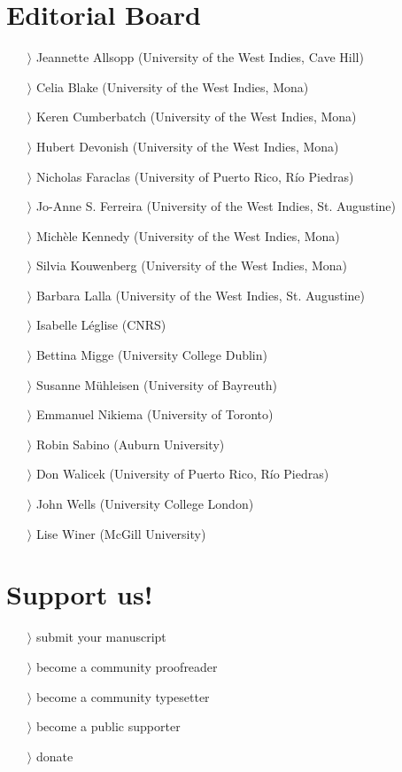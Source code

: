 \documentclass[
notumble,
nofoldmark,
]{leaflet}
\begin{document}
{{    \section{\color{LIGHTGRAY} \sffamily \Large Editorial Board }   
    \begin{itemize}
    \item[$\rangle$] Jeannette Allsopp (University of the West Indies, Cave Hill)
    \item[$\rangle$] Celia Blake (University of the West Indies, Mona)
    \item[$\rangle$] Keren Cumberbatch (University of the West Indies, Mona)
    \item[$\rangle$] Hubert Devonish (University of the West Indies, Mona)
    \item[$\rangle$] Nicholas Faraclas (University of Puerto Rico, R\'io Piedras)
    \item[$\rangle$] Jo-Anne S. Ferreira (University of the West Indies, St. Augustine)
    \item[$\rangle$] Mich\`ele Kennedy (University of the West Indies, Mona)
    \item[$\rangle$] Silvia Kouwenberg (University of the West Indies, Mona)
    \item[$\rangle$] Barbara Lalla (University of the West Indies, St. Augustine)
    \item[$\rangle$] Isabelle L\'eglise (CNRS)
    \item[$\rangle$] Bettina Migge (University College Dublin)
    \item[$\rangle$] Susanne M\"uhleisen (University of Bayreuth)
    \item[$\rangle$] Emmanuel Nikiema (University of Toronto)
    \item[$\rangle$] Robin Sabino (Auburn University)
    \item[$\rangle$] Don Walicek (University of Puerto Rico, Río Piedras)
    \item[$\rangle$] John Wells (University College London)
    \item[$\rangle$] Lise Winer (McGill University)
    \end{itemize}
    
    \section{\color{LIGHTGRAY} \sffamily \Large Support us!}
	\begin{itemize}
	  \item[$\rangle$] submit your manuscript 
	  \item[$\rangle$] become a community proofreader 
	  \item[$\rangle$] become a community typesetter
	  \item[$\rangle$] become a public supporter
	  \item[$\rangle$] donate
	\end{itemize} 
}}
\end{document}
